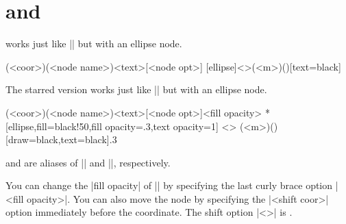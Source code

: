 \begin{tzcode}{.3}
\end{tzcode}



\section{\protect\cmd{\tznodeellipse} and \protect\cmd{\tznodeellipse*}}
\label{s:tznodeellipse}

\icmd{\tznodeellipse} works just like |\tznodeframe| but with an ellipse node.

\begin{tzdef}
(<coor>)(<node name>){<text>}[<node opt>]
  [ellipse]<>(<m>)(){}[text=black]
\end{tzdef}

The starred version \icmd{\tznodeellipse*} works just like |\tznodeframe*| but with an ellipse node.

\begin{tzdef}
               (<coor>)(<node name>){<text>}[<node opt>]{<fill opacity>}
 *[ellipse,fill=black!50,fill opacity=.3,text opacity=1] <>
  (<m>)(){}[draw=black,text=black]{.3}
\end{tzdef}


\begin{tzcode}{.3}
{}
\end{tzcode}

\icmd{\tznodeoval} and \icmd{\tznodeoval*} are aliases of |\tznodeellipse| and |\tznodeellipse*|, respectively.

You can change the |fill opacity| of |\tznodeellipse*| by specifying the last curly brace option |{<fill opacity>}|. You can also move the node by specifying the |<shift coor>| option immediately before the coordinate.
The  shift option |<>| is .

